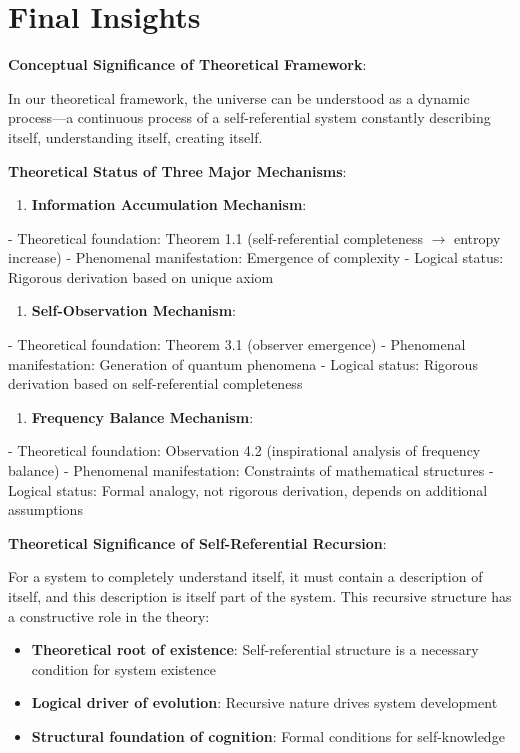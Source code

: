 \section{Final Insights}
\label{sec:ch06_conclusion:final-insights}

\textbf{Conceptual Significance of Theoretical Framework}:

In our theoretical framework, the universe can be understood as a dynamic process---a continuous process of a self-referential system constantly describing itself, understanding itself, creating itself.

\textbf{Theoretical Status of Three Major Mechanisms}:

\begin{enumerate}
\item \textbf{Information Accumulation Mechanism}:
\end{enumerate}
   - Theoretical foundation: Theorem 1.1 (self-referential completeness $\rightarrow$ entropy increase)
   - Phenomenal manifestation: Emergence of complexity
   - Logical status: Rigorous derivation based on unique axiom

\begin{enumerate}
\item \textbf{Self-Observation Mechanism}:
\end{enumerate}
   - Theoretical foundation: Theorem 3.1 (observer emergence)
   - Phenomenal manifestation: Generation of quantum phenomena
   - Logical status: Rigorous derivation based on self-referential completeness

\begin{enumerate}
\item \textbf{Frequency Balance Mechanism}:
\end{enumerate}
   - Theoretical foundation: Observation 4.2 (inspirational analysis of frequency balance)
   - Phenomenal manifestation: Constraints of mathematical structures
   - Logical status: Formal analogy, not rigorous derivation, depends on additional assumptions

\textbf{Theoretical Significance of Self-Referential Recursion}:

For a system to completely understand itself, it must contain a description of itself, and this description is itself part of the system. This recursive structure has a constructive role in the theory:

\begin{itemize}
\item \textbf{Theoretical root of existence}: Self-referential structure is a necessary condition for system existence
\item \textbf{Logical driver of evolution}: Recursive nature drives system development
\item \textbf{Structural foundation of cognition}: Formal conditions for self-knowledge
\end{itemize}


